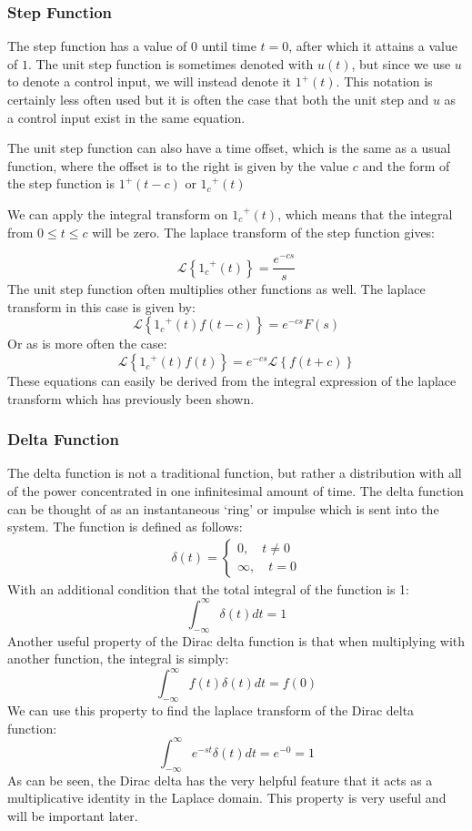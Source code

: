 \subsubsection{Step Function}
The step function has a value of $0$ until time $t=0$, after which it attains a value of $1$. The unit step function is sometimes denoted with $u(t)$, but since we use $u$ to denote a control input, we will instead denote it $1^+(t)$. This notation is certainly less often used but it is often the case that both the unit step and $u$ as a control input exist in the same equation.

The unit step function can also have a time offset, which is the same as a usual function, where the offset is to the right is given by the value $c$ and the form of the step function is $1^+(t-c)$ or ${1_c}^+(t)$

We can apply the integral transform on ${1_c}^+(t)$, which means that the integral from $0\le t \le c$ will be zero. The \gls{laplace transform} of the step function gives:

$$\mathscr{L}\left\{{1_c}^+(t)\right\}=\frac{e^{-cs}}{s}$$
The unit step function often multiplies other functions as well. The \gls{laplace transform} in this case is given by:
$$\mathscr{L}\left\{{1_c}^+(t)f(t-c)\right\}=e^{-cs}F(s)$$
Or as is more often the case:
$$\mathscr{L}\left\{{1_c}^+(t)f(t)\right\}=e^{-cs}\mathscr{L}\left\{f(t+c)\right\}$$
These equations can easily be derived from the integral expression of the \gls{laplace transform} which has previously been shown.

\subsubsection{Delta Function}
The delta function is not a traditional function, but rather a distribution with all of the power concentrated in one infinitesimal amount of time. The delta function can be thought of as an instantaneous `ring' or impulse which is sent into the system. The function is defined as follows:
\begin{gather}
    \delta(t)=\begin{cases}
        0,\quad t\neq0\\
        \infty,\quad t=0
    \end{cases}
\end{gather}
With an additional condition that the total integral of the function is 1:
$$\int_{-\infty}^{\infty}\delta(t)dt=1$$
Another useful property of the Dirac delta function is that when multiplying with another function, the integral is simply:
$$\int_{-\infty}^{\infty}f(t)\delta(t)dt=f(0)$$
We can use this property to find the \gls{laplace transform} of the Dirac delta function:
$$\int_{-\infty}^{\infty}e^{-st}\delta(t)dt=e^{-0}=1$$
As can be seen, the Dirac delta has the very helpful feature that it acts as a multiplicative identity in the Laplace domain. This property is very useful and will be important later.

